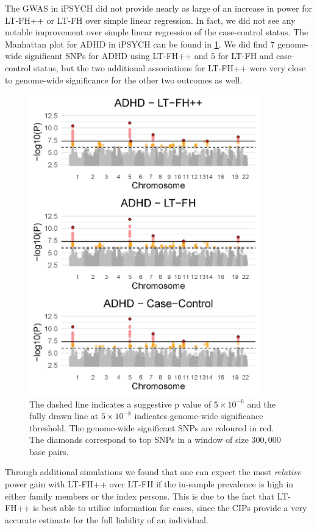 The GWAS in iPSYCH did not provide nearly as large of an increase in power for LT-FH++ or LT-FH over simple linear regression. In fact, we did not see any notable improvement over simple linear regression of the case-control status. The Manhattan plot for ADHD in iPSYCH can be found in \cref{fig:LTFH++_manhattanADHD}. We did find $ 7 $ genome-wide significant SNPs for ADHD using LT-FH++ and $ 5 $ for LT-FH and case-control status, but the two additional associations for LT-FH++ were very close to genome-wide significance for the other two outcomes as well.
\begin{figure}
	\includegraphics[width=10cm]{results/manhattanPlot_ADHD.png}
	\caption[Manhattan plots for LT-FH++, LT-FH, and case-control GWAS of ADHD in the iPSYCH data]{The dashed line indicates a suggestive p value of $ 5\times 10^{-6} $ and the fully drawn line at $ 5\times 10^{-8} $ indicates genome-wide significance threshold. The genome-wide significant SNPs are coloured in red. The diamonds correspond to top SNPs in a window of size $ 300,000 $ base pairs.}	
	\label{fig:LTFH++_manhattanADHD}
\end{figure}
Through additional simulations we found that one can expect the most \textit{relative} power gain with LT-FH++ over LT-FH if the in-sample prevalence is high in either family members or the index persons. This is due to the fact that LT-FH++ is best able to utilise information for cases, since the CIPs provide a very accurate estimate for the full liability of an individual.
